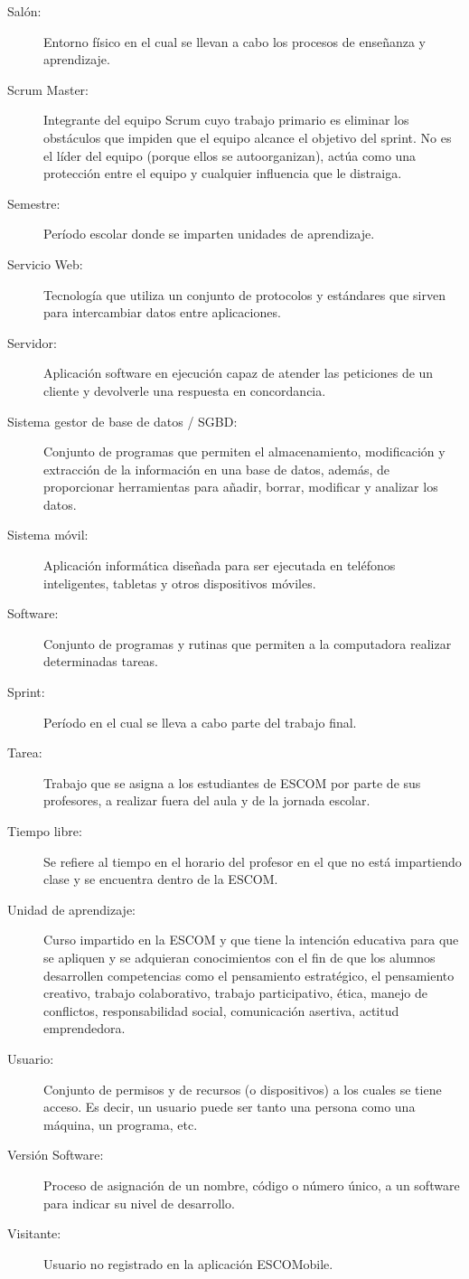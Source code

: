 \begin{description}
	\item[Salón:] Entorno físico en el cual se llevan a cabo los procesos de enseñanza y aprendizaje.
	\item[Scrum Master:] Integrante del equipo Scrum cuyo trabajo primario es eliminar los obstáculos que impiden que el equipo alcance el objetivo del sprint. No es el líder del equipo (porque ellos se autoorganizan), actúa como una protección entre el equipo y cualquier influencia que le distraiga. 
	\item[Semestre:] Período escolar donde se imparten unidades de aprendizaje.
	\item[Servicio Web:] Tecnología que utiliza un conjunto de protocolos y estándares que sirven para intercambiar datos entre aplicaciones.
	\item[Servidor:] Aplicación software en ejecución capaz de atender las peticiones de un cliente y devolverle una respuesta en concordancia.
	\item[Sistema gestor de base de datos / SGBD:] Conjunto de programas que permiten el almacenamiento, modificación y extracción de la información en una base de datos, además, de proporcionar herramientas para añadir, borrar, modificar y analizar los datos. 
	\item[Sistema móvil:] Aplicación informática diseñada para ser ejecutada en teléfonos inteligentes, tabletas y otros dispositivos móviles. 
	\item[Software:] Conjunto de programas y rutinas que permiten a la computadora realizar determinadas tareas.
	\item[Sprint:] Período en el cual se lleva a cabo parte del trabajo final. 

	\item[Tarea:] Trabajo que se asigna a los estudiantes de ESCOM por parte de sus profesores, a realizar fuera del aula y de la jornada escolar.
	\item[Tiempo libre:] Se refiere al tiempo en el horario del profesor en el que no está impartiendo clase y se encuentra dentro de la ESCOM.
	
	\item[Unidad de aprendizaje:] Curso impartido en la ESCOM y que tiene la intención educativa para que se apliquen y se adquieran conocimientos con el fin de que los alumnos desarrollen competencias como el pensamiento estratégico, el pensamiento creativo, trabajo colaborativo, trabajo participativo, ética, manejo de conflictos, responsabilidad social, comunicación asertiva, actitud emprendedora.
	\item[Usuario:] Conjunto de permisos y de recursos (o dispositivos) a los cuales se tiene acceso. Es decir, un usuario puede ser tanto una persona como una máquina, un programa, etc.
	
	\item[Versión Software:] Proceso de asignación de un nombre, código o número único, a un software para indicar su nivel de desarrollo.
	\item[Visitante:] Usuario no registrado en la aplicación ESCOMobile.
\end{description}

